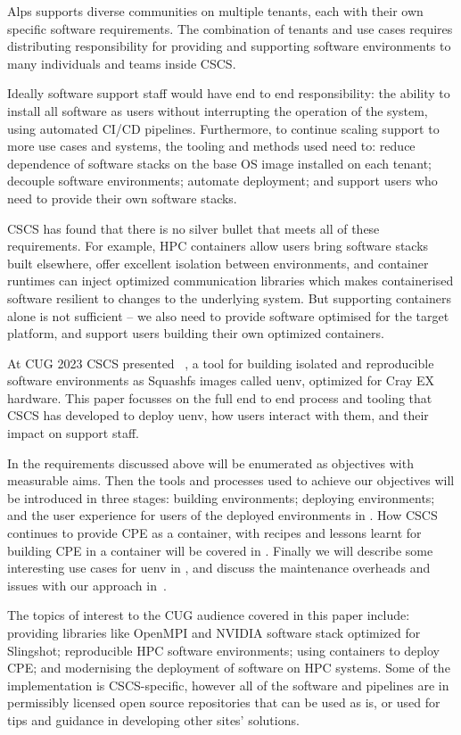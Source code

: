 Alps supports diverse communities on multiple tenants, each with their own specific software requirements.
The combination of tenants and use cases requires distributing responsibility for providing and supporting software environments to many individuals and teams inside CSCS.

Ideally software support staff would have end to end responsibility: the ability to install all software as users without interrupting the operation of the system, using automated CI/CD pipelines.
Furthermore, to continue scaling support to more use cases and systems, the tooling and methods used need to: reduce dependence of software stacks on the base OS image installed on each tenant; decouple software environments; automate deployment; and support users who need to provide their own software stacks.

CSCS has found that there is no silver bullet that meets all of these requirements.
For example, HPC containers allow users bring software stacks built elsewhere, offer excellent isolation between environments, and container runtimes can inject optimized communication libraries which makes containerised software resilient to changes to the underlying system.
But supporting containers alone is not sufficient -- we also need to provide software optimised for the target platform, and support users building their own optimized containers.

At CUG 2023 CSCS presented \stackinator~\cite{uenv2023}, a tool for building isolated and reproducible software environments as Squashfs images called uenv, optimized for Cray EX hardware.
This paper focusses on the full end to end process and tooling that CSCS has developed to deploy uenv, how users interact with them, and their impact on support staff.

In  the requirements discussed above will be enumerated as objectives with measurable aims.
Then the tools and processes used to achieve our objectives will be introduced in three stages: building environments; deploying environments; and the user experience for users of the deployed environments in .
How CSCS continues to provide CPE as a container, with recipes and lessons learnt for building CPE in a container will be covered in .
Finally we will describe some interesting use cases for uenv in , and discuss the maintenance overheads and issues with our approach in~.

The topics of interest to the CUG audience covered in this paper include: providing libraries like OpenMPI and NVIDIA software stack optimized for Slingshot; reproducible HPC software environments; using containers to deploy CPE; and modernising the deployment of software on HPC systems.
Some of the implementation is CSCS-specific, however all of the software and pipelines are in permissibly licensed open source repositories that can be used as is, or used for tips and guidance in developing other sites' solutions.

